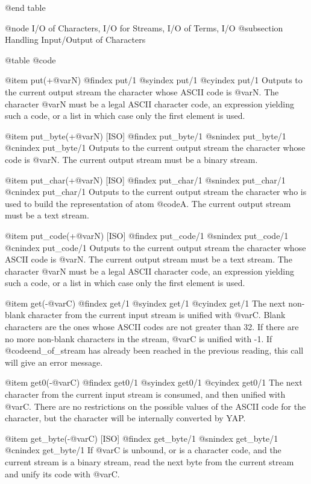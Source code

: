 {{{{{{@end table

@node I/O of Characters, I/O for Streams, I/O of Terms, I/O
@subsection Handling Input/Output of Characters

@table @code

@item put(+@var{N})
@findex put/1
@syindex put/1
@cyindex put/1
Outputs to the current output stream the character whose ASCII code is
@var{N}. The character @var{N} must be a legal ASCII character code, an
expression yielding such a code, or a list in which case only the first
element is used.

@item put_byte(+@var{N}) [ISO]
@findex put_byte/1
@snindex put_byte/1
@cnindex put_byte/1
Outputs to the current output stream the character whose code is
@var{N}. The current output stream must be a binary stream.

@item put_char(+@var{N}) [ISO]
@findex put_char/1
@snindex put_char/1
@cnindex put_char/1
Outputs to the current output stream the character who is used to build
the representation of atom @code{A}. The current output stream must be a
text stream.

@item put_code(+@var{N}) [ISO]
@findex put_code/1
@snindex put_code/1
@cnindex put_code/1
Outputs to the current output stream the character whose ASCII code is
@var{N}. The current output stream must be a text stream. The character
@var{N} must be a legal ASCII character code, an expression yielding such
a code, or a list in which case only the first element is used.

@item get(-@var{C})
@findex get/1
@syindex get/1
@cyindex get/1
The next non-blank character from the current input stream is unified
with @var{C}. Blank characters are the ones whose ASCII codes are not
greater than 32. If there are no more non-blank characters in the
stream, @var{C} is unified with -1. If @code{end_of_stream} has already
been reached in the previous reading, this call will give an error message.

@item get0(-@var{C})
@findex get0/1
@syindex get0/1
@cyindex get0/1
The next character from the current input stream is consumed, and then
unified with @var{C}. There are no restrictions on the possible
values of the ASCII code for the character, but the character will be
internally converted by YAP.

@item get_byte(-@var{C}) [ISO]
@findex get_byte/1
@snindex get_byte/1
@cnindex get_byte/1
If @var{C} is unbound, or is a character code, and the current stream is a
binary stream, read the next byte from the current stream and unify its
code with @var{C}.

}}}}}}
